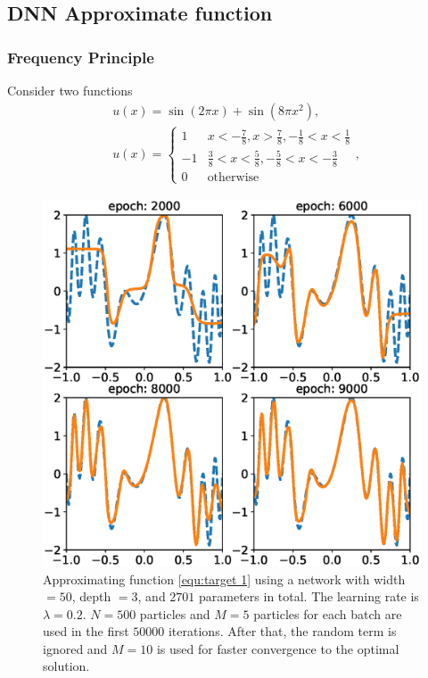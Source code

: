 \documentclass{beamer}
\begin{document}
\subsection{DNN Approximate function}
\begin{frame}
\frametitle{Frequency Principle}
	Consider two functions
\begin{align}
	\label{equ:target 1} &u(x) = \sin(2\pi x) + \sin(8 \pi x ^2), \\
	\label{equ:target 2} &u(x) = \left\{\begin{matrix}
		1   & x < -\frac{7}{8}, x> \frac{7}{8}, -\frac{1}{8}<x<\frac{1}{8}\\
		-1  & \frac{3}{8}< x< \frac{5}{8} , -\frac{5}{8}< x<- \frac{3}{8}\\
		0 & \text{otherwise} 
	\end{matrix} \right.,
\end{align}
\end{frame}
\begin{frame}
\begin{figure}[ht]
	\centering
	\includegraphics[width=0.6\linewidth]{Figure/Fprinciple_exm1}
	\caption{Approximating function \eqref{equ:target 1} using a network with  width $ = 50$, depth $ = 3$, and $2701$ parameters in total. The learning rate is $\lambda=0.2$. $N = 500$ particles and $M=5$ particles for each batch are used in the first $50000$ iterations. After that, the random term is ignored and $M = 10$ is used for faster convergence to the optimal solution.}
	\label{fig:fprincipleexm1}
\end{figure}	
\end{frame}
\end{document}
